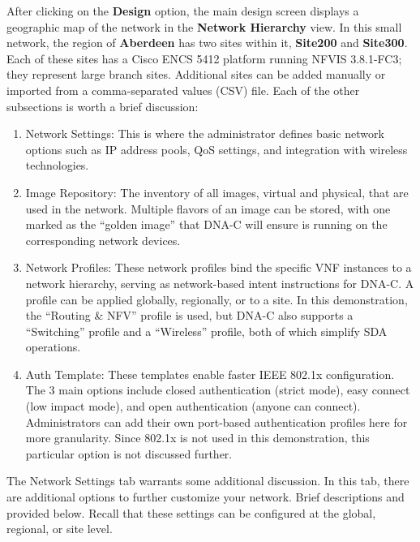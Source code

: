 After clicking on the \textbf{Design} option, the main design screen displays
a geographic map of the network in the \textbf{Network Hierarchy} view. In
this small network, the region of \textbf{Aberdeen} has two sites within it,
\textbf{Site200} and \textbf{Site300}. Each of these sites has a Cisco ENCS
5412 platform running NFVIS 3.8.1-FC3; they represent large branch sites.
Additional sites can be added manually or imported from a comma-separated
values (CSV) file. Each of the other subsections is worth a brief discussion:

\begin{enumerate}
  \item Network Settings: This is where the administrator defines basic
  network options such as IP address pools, QoS settings, and integration with
  wireless technologies.
  \item Image Repository: The inventory of all images, virtual and physical,
  that are used in the network. Multiple flavors of an image can be stored, with
  one marked as the ``golden image'' that DNA-C will ensure is running on the
  corresponding network devices.
  \item Network Profiles: These network profiles bind the specific VNF
  instances to a network hierarchy, serving as network-based intent instructions
  for DNA-C. A profile can be applied globally, regionally, or to a site. In
  this demonstration, the ``Routing \& NFV'' profile is used, but DNA-C also
  supports a ``Switching'' profile and a ``Wireless'' profile, both of which
  simplify SDA operations.
  \item Auth Template: These templates enable faster IEEE 802.1x
  configuration. The 3 main options include closed authentication (strict mode),
  easy connect (low impact mode), and open authentication (anyone can connect).
  Administrators can add their own port-based authentication profiles here for
  more granularity. Since 802.1x is not used in this demonstration, this
  particular option is not discussed further.
\end{enumerate}


The Network Settings tab warrants some additional discussion. In this tab,
there are additional options to further customize your network. Brief
descriptions and provided below. Recall that these settings can be configured
at the global, regional, or site level.

